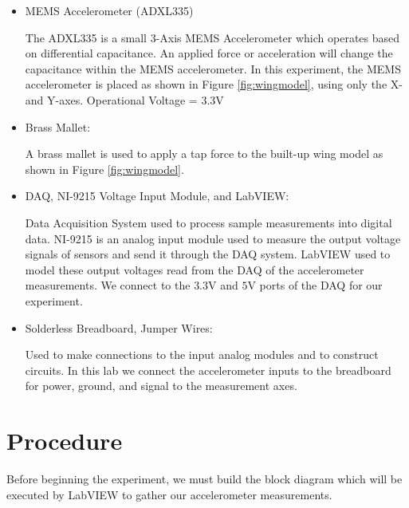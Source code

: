 \documentclass{article}
\begin{document}
\begin{itemize}
\item MEMS Accelerometer (ADXL335)
\vspace{1mm}

The ADXL335 is a small 3-Axis MEMS Accelerometer which operates based on differential capacitance. An applied force or acceleration will change the capacitance within the MEMS accelerometer. In this experiment, the MEMS accelerometer is placed as shown in Figure \ref{fig:wingmodel}, using only the X-and Y-axes. Operational Voltage = $3.3\text{V}$
\vspace{2.5mm}

\item Brass Mallet: 
\vspace{1mm}

A brass mallet is used to apply a tap force to the built-up wing model as shown in Figure \ref{fig:wingmodel}. 
\vspace{2.5mm}

\item DAQ, NI-9215 Voltage Input Module, and LabVIEW:
\vspace{1mm}

Data Acquisition System used to process sample measurements into digital data. NI-9215 is an analog input module used to measure the output voltage signals of sensors and send it through the DAQ system. LabVIEW used to model these output voltages read from the DAQ of the accelerometer measurements. We connect to the $3.3 \text{V}$ and $5 \text{V}$ ports of the DAQ for our experiment.
\vspace{2.5mm}

\item Solderless Breadboard, Jumper Wires: 
\vspace{1mm}

Used to make connections to the input analog modules and to construct circuits. In this lab we connect the accelerometer inputs to the breadboard for power, ground, and signal to the measurement axes.

\end{itemize}

\section{Procedure}
Before beginning the experiment, we must build the block diagram which will be executed by LabVIEW to gather our accelerometer measurements. 
\end{document}

